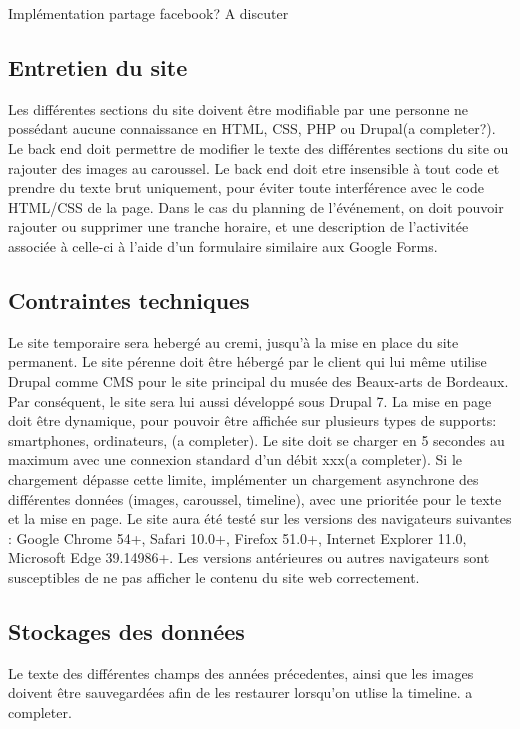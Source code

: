 \documentclass[12pt]{article}
\begin{document}
 Implémentation partage facebook? A discuter


\subsection*{Entretien du site}

Les différentes sections du site doivent être modifiable par une personne ne possédant aucune connaissance en HTML, CSS, PHP ou Drupal(a completer?). Le back end doit permettre de modifier le texte des différentes sections du site ou rajouter des images au caroussel. Le back end doit etre insensible à tout code et prendre du texte brut uniquement, pour éviter toute interférence avec le code HTML/CSS de la page. Dans le cas du planning de l'événement, on doit pouvoir rajouter ou supprimer une tranche horaire, et une description de l'activitée associée à celle-ci à l'aide d'un formulaire similaire aux Google Forms.

\subsection*{Contraintes techniques}

Le site temporaire sera hebergé au cremi, jusqu'à la mise en place du site permanent.
Le site pérenne doit être hébergé par le client qui lui même utilise Drupal comme CMS pour le site principal du musée des Beaux-arts de Bordeaux. Par conséq\-uent, le site sera lui aussi développé sous Drupal 7. La mise en page doit être dynamique, pour pouvoir être affichée sur plusieurs types de supports: smartphones, ordinateurs, (a completer). Le site doit se charger en 5 secondes au maximum avec une connexion standard d'un débit xxx(a completer). Si le chargement dépasse cette limite, implémenter un chargement asynchrone des différentes données (images, caroussel, timeline), avec une prioritée pour le texte et la mise en page. Le site aura été testé sur les versions des navigateurs suivantes : Google Chrome 54+, Safari 10.0+, Firefox 51.0+, Internet Explorer 11.0, Microsoft Edge 39.14986+. Les versions antérieures ou autres navigateurs sont susceptibles de ne pas afficher le contenu du site web correctement.

\subsection*{Stockages des données}

Le texte des différentes champs des années précedentes, ainsi que les images doivent être sauvegardées afin de les restaurer lorsqu'on utlise la timeline. a completer.
\end{document}
